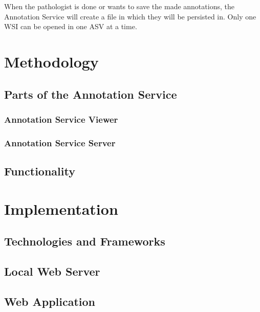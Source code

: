 When the pathologist is done or wants to save the made annotations, the Annotation Service will create a file in which they will be persisted in. Only one WSI can be opened in one ASV at a time.

\section{Methodology}
\subsection{Parts of the Annotation Service}
\subsubsection{Annotation Service Viewer}
\subsubsection{Annotation Service Server}

\subsection{Functionality}

\section{Implementation}
\subsection{Technologies and Frameworks}
\subsection{Local Web Server}
\subsection{Web Application}
